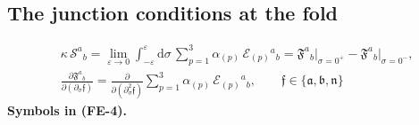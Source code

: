\documentclass[
  10pt,
]{article}
\begin{document}
\hypertarget{the-junction-conditions-at-the-fold}{%
\subsection{The junction conditions at the
fold}\label{the-junction-conditions-at-the-fold}}

\[
\begin{aligned}
&\kappa\,\mathcal{S}^a{}_b = \lim_{\varepsilon\to0}\int_{-\varepsilon}^{\varepsilon}\mathrm{d}\sigma\,
 \sum_{p=1}^{3}\alpha_{(p)}\,\mathcal{E}_{(p)}{}^a{}_b
 = \mathfrak{F}^a{}_b\big\vert_{\sigma=0^+} - \mathfrak{F}^a{}_b\big\vert_{\sigma=0^-},\\
&\frac{\partial\mathfrak{F}^a{}_b}{\partial(\partial_\sigma\mathfrak{f})}
 = \frac{\partial}{\partial(\partial_\sigma^2\mathfrak{f})}\sum_{p=1}^{3}\alpha_{(p)}\,\mathcal{E}_{(p)}{}^a{}_b,
 \qquad \mathfrak{f} \in \{\mathfrak{a}, \mathfrak{b}, \mathfrak{n}\}
\end{aligned} \tag{FE-4}
\] \textbf{Symbols in (FE-4).}
\end{document}
